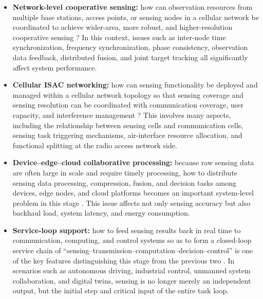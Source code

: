 \begin{itemize}
    \item \textbf{Network-level cooperative sensing:} how can observation resources from multiple base stations, access points, or sensing nodes in a cellular network be coordinated to achieve wider-area, more robust, and higher-resolution cooperative sensing \cite{Zhang2020perceptive,Cui2024integrated}? In this context, issues such as inter-node time synchronization, frequency synchronization, phase consistency, observation data feedback, distributed fusion, and joint target tracking all significantly affect system performance.
    
    \item \textbf{Cellular ISAC networking:} how can sensing functionality be deployed and managed within a cellular network topology so that sensing coverage and sensing resolution can be coordinated with communication coverage, user capacity, and interference management \cite{Liu2022ISAC,Zhang2020perceptive}? This involves many aspects, including the relationship between sensing cells and communication cells, sensing task triggering mechanisms, air-interface resource allocation, and functional splitting at the radio access network side.
    
    \item \textbf{Device--edge--cloud collaborative processing:} because raw sensing data are often large in scale and require timely processing, how to distribute sensing data processing, compression, fusion, and decision tasks among devices, edge nodes, and cloud platforms becomes an important system-level problem in this stage \cite{Gonzalez2024integrated,Saad2020Vision6G}. This issue affects not only sensing accuracy but also backhaul load, system latency, and energy consumption.
    
    \item \textbf{Service-loop support:} how to feed sensing results back in real time to communication, computing, and control systems so as to form a closed-loop service chain of ``sensing--transmission--computation--decision--control'' is one of the key features distinguishing this stage from the previous two \cite{Liu2022ISAC,Saad2020Vision6G}. In scenarios such as autonomous driving, industrial control, unmanned system collaboration, and digital twins, sensing is no longer merely an independent output, but the initial step and critical input of the entire task loop.
\end{itemize}

